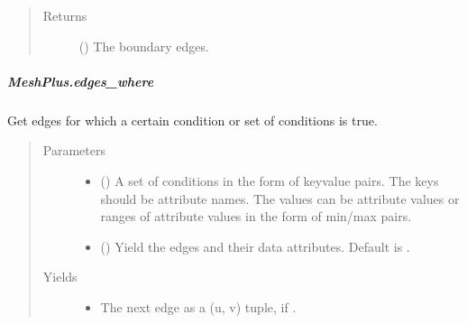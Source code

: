 \documentclass[letterpaper,10pt,english]{sphinxmanual}
\begin{document}
\begin{fulllineitems}
\begin{fulllineitems}
\begin{quote}
\begin{description}
\item[{Returns}] \leavevmode
{} () \textendash{} The boundary edges.

\end{description}\end{quote}

\end{fulllineitems}



\subparagraph{MeshPlus.edges\_where}
\label{\detokenize{api/generated/directional_clustering.mesh.MeshPlus.edges_where:meshplus-edges-where}}\label{\detokenize{api/generated/directional_clustering.mesh.MeshPlus.edges_where::doc}}

\begin{fulllineitems}
\label{\detokenize{api/generated/directional_clustering.mesh.MeshPlus.edges_where:directional_clustering.mesh.MeshPlus.edges_where}}
Get edges for which a certain condition or set of conditions is true.
\begin{quote}\begin{description}
\item[{Parameters}] \leavevmode\begin{itemize}
\item {} 
 () \textendash{} A set of conditions in the form of key\sphinxhyphen{}value pairs.
The keys should be attribute names. The values can be attribute
values or ranges of attribute values in the form of min/max pairs.

\item {} 
 () \textendash{} Yield the edges and their data attributes.
Default is .

\end{itemize}

\item[{Yields}] \leavevmode\begin{itemize}
\item {} 
 \textendash{} The next edge as a (u, v) tuple, if .


\end{itemize}
\end{description}
\end{quote}
\end{fulllineitems}
\end{fulllineitems}
\end{document}
